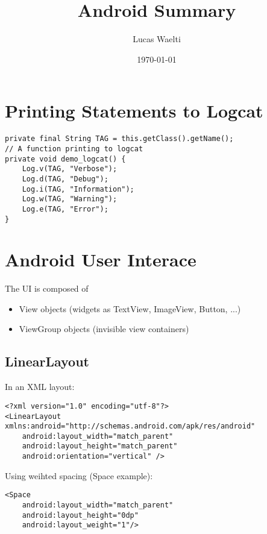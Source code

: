 \documentclass[11pt]{article}
\title{Android Summary}
\author{Lucas Waelti}
\date{\today}
\begin{document}
\maketitle
\tableofcontents
\newpage



\section{Printing Statements to Logcat}
\lstset{language = Java}
\begin{lstlisting}
private final String TAG = this.getClass().getName();
// A function printing to logcat
private void demo_logcat() {
    Log.v(TAG, "Verbose");
    Log.d(TAG, "Debug");
    Log.i(TAG, "Information");
    Log.w(TAG, "Warning");
    Log.e(TAG, "Error");
}
\end{lstlisting}

\section{Android User Interace}
The UI is composed of 
\begin{itemize}
    \item View objects (widgets as TextView, ImageView, Button, ...)
    \item ViewGroup objects (invisible view containers)
\end{itemize}

\subsection{LinearLayout}
In an XML layout:
\lstset{language = XML}
\begin{lstlisting}
<?xml version="1.0" encoding="utf-8"?>
<LinearLayout xmlns:android="http://schemas.android.com/apk/res/android"
    android:layout_width="match_parent"
    android:layout_height="match_parent"
    android:orientation="vertical" />
\end{lstlisting}
Using weihted spacing (Space example):
\begin{lstlisting}
<Space
    android:layout_width="match_parent"
    android:layout_height="0dp"
    android:layout_weight="1"/>
\end{lstlisting}
\end{document}
